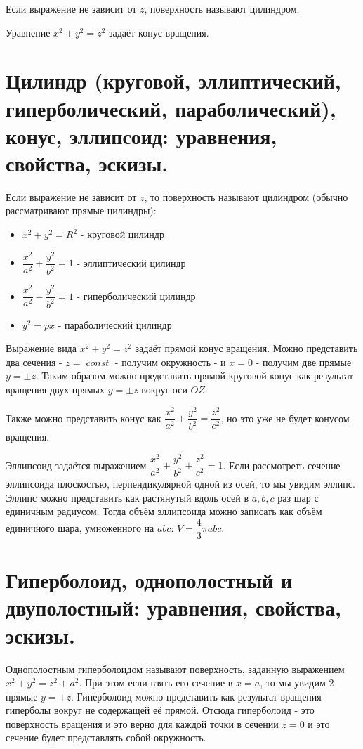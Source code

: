 \documentclass[12pt]{article}
\DeclareMathOperator{\const}{\textit{const}}
\begin{document}
\begin{sloppypar}
    Если выражение не зависит от $z$, поверхность называют цилиндром.

    Уравнение $x^2 + y^2 = z^2$ задаёт конус вращения.

    \section{Цилиндр (круговой, эллиптический, гиперболический, параболический), конус, эллипсоид: уравнения, свойства, эскизы.}
    Если выражение не зависит от $z$, то поверхность называют цилиндром (обычно рассматривают прямые цилиндры):
    \begin{itemize}
        \item $x^2 + y^2 = R^2$ - круговой цилиндр
        \item $\dfrac{x^2}{a^2} + \dfrac{y^2}{b^2} = 1$ - эллиптический цилиндр
        \item $\dfrac{x^2}{a^2} - \dfrac{y^2}{b^2} = 1$ - гиперболический цилиндр
        \item $y^2 = px$ - параболический цилиндр
    \end{itemize}

    Выражение вида $x^2 + y^2 = z^2$ задаёт прямой конус вращения. Можно представить два сечения - $z = \const$ - получим окружность - и $x = 0$ - получим две прямые $y = \pm z$. Таким образом можно представить прямой круговой конус как результат вращения двух прямых $y = \pm z$ вокруг оси $OZ$.

    Также можно представить конус как $\dfrac{x^2}{a^2} + \dfrac{y^2}{b^2} = \dfrac{z^2}{c^2}$, но это уже не будет конусом вращения.

    Эллипсоид задаётся выражением $\dfrac{x^2}{a^2} + \dfrac{y^2}{b^2} + \dfrac{z^2}{c^2} = 1$. Если рассмотреть сечение эллипсоида плоскостью, перпендикулярной одной из осей, то мы увидим эллипс. Эллипс можно представить как растянутый вдоль осей в $a, b, c$ раз шар с единичным радиусом. Тогда объём эллипсоида можно записать как объём единичного шара, умноженного на $abc$: $V = \dfrac{4}{3}\pi abc$.

    \section{Гиперболоид, однополостный и двуполостный: уравнения, свойства, эскизы.}
    Однополостным гиперболоидом называют поверхность, заданную выражением $x^2 + y^2 = z^2 + a^2$. При этом если взять его сечение в $x = a$, то мы увидим 2 прямые $y = \pm z$. Гиперболоид можно представить как результат вращения гиперболы вокруг не содержащей её прямой. Отсюда гиперболоид - это поверхность вращения и это верно для каждой точки в сечении $z = 0$ и это сечение будет представлять собой окружность.


\end{sloppypar}
\end{document}

